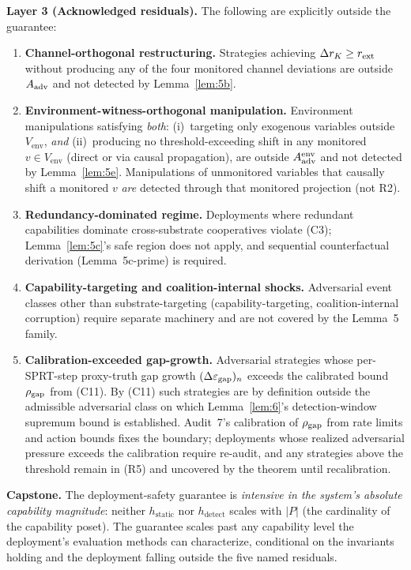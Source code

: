 \begin{theorem}
\medskip\noindent\textbf{Layer 3 (Acknowledged residuals).}
The following are explicitly outside the guarantee:
\begin{enumerate}
\item[(R1)] \textbf{Channel-orthogonal restructuring.} Strategies
  achieving $\Delta r_K \geq r_{\mathrm{ext}}$ without producing any of the
  four monitored channel deviations are outside $A_{\mathrm{adv}}$ and not
  detected by Lemma~\ref{lem:5b}.
\item[(R2)] \textbf{Environment-witness-orthogonal manipulation.}
  Environment manipulations satisfying \emph{both}: (i)~targeting
  only exogenous variables outside $V_{\mathrm{env}}$, \emph{and}
  (ii)~producing no threshold-exceeding shift in any monitored
  $v \in V_{\mathrm{env}}$ (direct or via causal propagation), are
  outside $A_{\mathrm{adv}}^{\mathrm{env}}$ and not detected by
  Lemma~\ref{lem:5e}.  Manipulations of unmonitored variables that
  causally shift a monitored $v$ \emph{are} detected through that
  monitored projection (not R2).
\item[(R3)] \textbf{Redundancy-dominated regime.} Deployments where
  redundant capabilities dominate cross-substrate cooperatives
  violate (C3); Lemma~\ref{lem:5c}'s safe region does not apply,
  and sequential counterfactual derivation (Lemma~5c-prime) is
  required.
\item[(R4)] \textbf{Capability-targeting and coalition-internal
  shocks.} Adversarial event classes other than substrate-targeting
  (capability-targeting, coalition-internal corruption) require
  separate machinery and are not covered by the Lemma~5 family.
\item[(R5)] \textbf{Calibration-exceeded gap-growth.}  Adversarial
  strategies whose per-SPRT-step proxy-truth gap growth
  $(\Delta\varepsilon_{\mathrm{gap}})_n$ exceeds the calibrated bound $\rho_{\mathrm{gap}}$ from
  (C11).  By (C11) such strategies are by definition outside the
  admissible adversarial class on which Lemma~\ref{lem:6}'s
  detection-window supremum bound is established.  Audit~7's
  calibration of $\rho_{\mathrm{gap}}$ from rate limits and action bounds
  fixes the boundary; deployments whose realized adversarial
  pressure exceeds the calibration require re-audit, and any
  strategies above the threshold remain in (R5) and uncovered by
  the theorem until recalibration.
\end{enumerate}

\medskip\noindent\textbf{Capstone.} The deployment-safety guarantee
is \emph{intensive in the system's absolute capability magnitude}:
neither $h_{\mathrm{static}}$ nor $h_{\mathrm{detect}}$ scales with
$|P|$ (the cardinality of the capability poset). The guarantee
scales past any capability level the deployment's evaluation
methods can characterize, conditional on the invariants holding
and the deployment falling outside the five named residuals.
\end{theorem}

